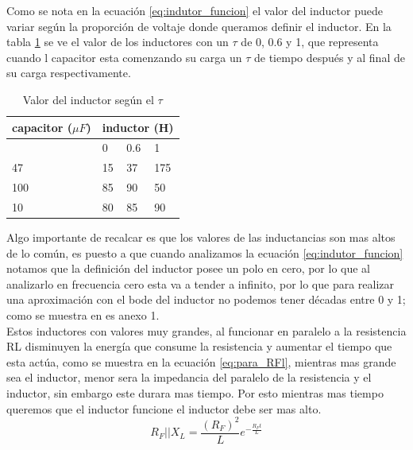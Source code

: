 \documentclass[journal]{IEEEtran}
\begin{document}
Como se nota en la ecuación \ref{eq:indutor_funcion} el valor del inductor puede variar según la proporción de voltaje donde queramos definir el inductor. En la tabla \ref{table:inductor} se ve el valor de los inductores con un \(\tau\) de 0, 0.6 y 1, que representa cuando l capacitor esta comenzando su carga un \(\tau\) de tiempo después y al final de su carga respectivamente.\\
\begin{table}[]
	\centering
	\caption{Valor del inductor según el \(\tau\)}
	\label{table:inductor}
\begin{tabular}{|l|l|l|l|}
	\hline
	capacitor (\(\mu F\)) & \multicolumn{3}{l|}{inductor (H)} \\ \hline
	& 0       & 0.6      & 1       \\ \hline
	47               & 15      & 37       & 175      \\ \hline
	100                   & 85      & 90       & 50      \\ \hline
	10                   & 80      & 85       & 90      \\ \hline
\end{tabular}
\end{table}
Algo importante de recalcar es que los valores de las inductancias son mas altos de lo común, es puesto a que cuando analizamos la ecuación \ref{eq:indutor_funcion} notamos que la definición del inductor posee un polo en cero, por lo que al analizarlo en frecuencia cero esta va a tender a infinito, por lo que para realizar una aproximación con el bode del inductor no podemos tener décadas entre 0 y 1; como se muestra en es anexo 1. \\ Estos inductores con valores muy grandes, al funcionar en paralelo a la resistencia RL  disminuyen la energía que consume la resistencia y aumentar el tiempo que esta actúa, como se muestra en la ecuación \ref{eq:para_RFl}, mientras mas grande sea el inductor, menor sera la impedancia del paralelo de la resistencia y el inductor, sin embargo este durara mas tiempo. Por esto mientras mas tiempo queremos que el inductor funcione el inductor debe ser mas alto.\\
\begin{equation}
\label{eq:para_RFl} 
R_F||X_L=\frac{(R_F)^{2}}{L}e^{-\frac{R_Ft}{L}}
\end{equation} 
\end{document}
